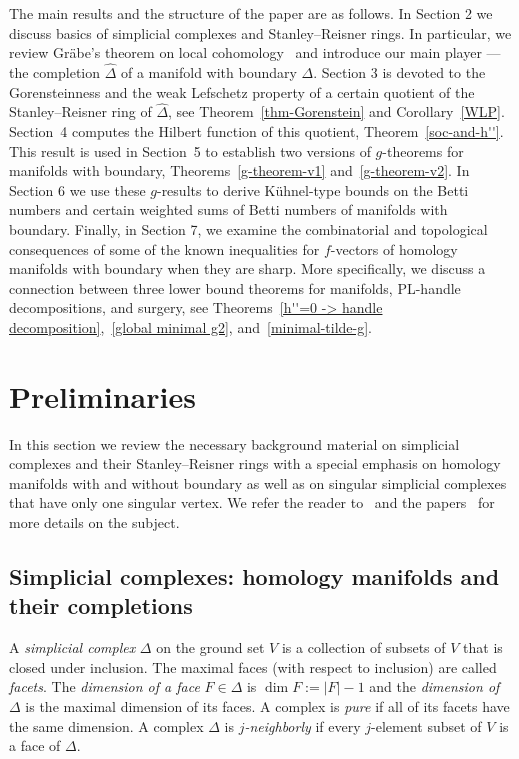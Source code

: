 \documentclass[ALCO,ThmDefs,Unicode,epreuves]{cedram}
\newcommand{\complet}[1]{\hat{#1}}
\begin{document}
The main results and the structure of the paper are as follows. In Section 2 we discuss basics of simplicial complexes and Stanley--Reisner rings. In particular, we review Gr{\"a}be's theorem on local cohomology~\cite{Grabe-84} and introduce our main player --- the completion $\complet{\Delta}$ of a manifold with boundary $\Delta$. Section 3 is devoted to the Gorensteinness and the weak Lefschetz property of a certain quotient of the Stanley--Reisner ring of $\complet{\Delta}$, see Theorem~\ref{thm-Gorenstein} and Corollary~\ref{WLP}. Section~4 computes the Hilbert function of this quotient, Theorem~\ref{soc-and-h''}. This result is used in Section~5 to establish two versions of $g$-theorems for manifolds with boundary, Theorems~\ref{g-theorem-v1} and~\ref{g-theorem-v2}. In Section 6 we use these $g$-results to derive K{\"u}hnel-type bounds on the Betti numbers and certain weighted sums of Betti numbers of manifolds with boundary. Finally, in Section 7, we examine the combinatorial and topological consequences of some of the known inequalities for $f$-vectors of homology manifolds with boundary when they are sharp. More specifically, we discuss a connection between three lower bound theorems for manifolds, PL-handle decompositions, and surgery, see Theorems~\ref{h''=0 -> handle decomposition},~\ref{global minimal g2}, and~\ref{minimal-tilde-g}.



\section{Preliminaries} \label{sec:Prelim}
In this section we review the necessary background material on simplicial complexes and their Stanley--Reisner rings with a special emphasis on homology manifolds with and without boundary as well as on singular simplicial complexes that have only one singular vertex. We refer the reader to~\cite[Chapter~2]{Stanley-96} and the papers~\cite{Novik-Swartz-09:Socles, Novik-Swartz-12} for more details on the subject. 

\subsection{Simplicial complexes: homology manifolds and their completions}
A \emph{simplicial complex} $\Delta$ on the ground set $V$ is a collection of subsets of $V$ that is closed under inclusion.
The maximal faces (with respect to inclusion) are called \emph{facets}. The \emph{dimension of a face} $F\in \Delta$ is $\dim F:=|F|-1$ and
the \emph{dimension of $\Delta$} is the maximal dimension of its faces. A complex is \emph{pure} if all of its facets have the same dimension. A complex $\Delta$ is \emph{$j$-neighborly} if every $j$-element subset of $V$ is a face of $\Delta$. 
\end{document}
